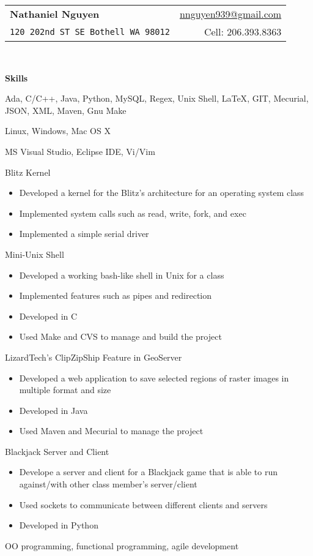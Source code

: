 \documentclass[letterpaper,11pt]{article}
\newcommand{\resitem}[1]{\item #1 \vspace{-2pt}}
\newcommand{\resheading}[1]{{\large \colorbox{mygrey}{\begin{minipage}{\textwidth}{\textbf{#1 \vphantom{p\^{E}}}}\end{minipage}}}}
\begin{document}
\newcommand{\mywebheader}{
\begin{tabular*}{7in}{l@{\extracolsep{\fill}}r}
	\textbf{{\LARGE Nathaniel Nguyen}} & \href{mailto:nnguyen939@gmail.com}{nnguyen939@gmail.com}\\
	{\footnotesize \texttt{{120 202nd ST SE Bothell WA 98012}}} & 
	{Cell:  206.393.8363}
	\end{tabular*}
\\
\vspace{0.1in}}

\mywebheader

\resheading{{Skills}}
	\begin{description}
		\item[Technologies:] { \footnotesize Ada, C/C++, Java, Python, MySQL, Regex, Unix Shell, {\LaTeX}, GIT, Mecurial, JSON, XML, Maven, Gnu Make}
		\item[Computer and OS:] { \footnotesize Linux, Windows, Mac OS X}
		\item[Software:]{\footnotesize
			{MS Visual Studio},
			{Eclipse IDE},
			{Vi/Vim}
} 
		\item[Projects:] {\footnotesize 
							\item Blitz Kernel
								\begin{itemize}
									\resitem{Developed a kernel for the Blitz's architecture for an operating system class}
									\resitem{Implemented system calls such as read, write, fork, and exec}
									\resitem{Implemented a simple serial driver}
								\end{itemize}
							\item Mini-Unix Shell
								\begin{itemize}
									\resitem{Developed a working bash-like shell in Unix for a class}
									\resitem{Implemented features such as pipes and redirection}
									\resitem{Developed in C}
									\resitem{Used Make and CVS to manage and build the project}
								\end{itemize}
								
							\item LizardTech's ClipZipShip Feature in GeoServer
								\begin{itemize}
									\resitem{Developed a web application to save selected regions of raster images in multiple format and size}
									\resitem{Developed in Java}
									\resitem{Used Maven and Mecurial to manage the project}
								\end{itemize}
							\item Blackjack Server and Client
								\begin{itemize}
									\resitem{Develope a server and client for a Blackjack game that is able to run against/with other class member's server/client}
									\resitem{Used sockets to communicate between different clients and servers}
									\resitem{Developed in Python}
								\end{itemize}
						}
			\item[Others:] {\footnotesize OO programming, functional programming, agile development}
	\end{description} %
	
\end{document}
